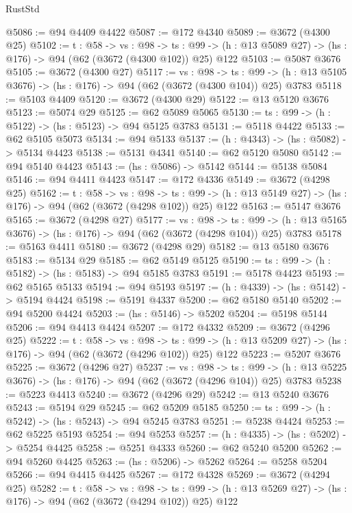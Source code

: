 \begin{lexlean}{RustStd}
\begin{coremodule}
{\begin{coremodule}
{{{{{{{{{@5086 := @94 @4409 @4422
@5087 := @172 @4340
@5089 := @3672 (@4300 @25)
@5102 := {t : @58} ->
  {vs : @98} ->
  {ts : @99} -> (h : @13 @5089 @27) -> (hs : @176) -> @94 (@62 (@3672 (@4300 @102)) @25) @122
@5103 := @5087 @3676
@5105 := @3672 (@4300 @27)
@5117 := {vs : @98} ->
  {ts : @99} -> (h : @13 @5105 @3676) -> (hs : @176) -> @94 (@62 (@3672 (@4300 @104)) @25) @3783
@5118 := @5103 @4409
@5120 := @3672 (@4300 @29)
@5122 := @13 @5120 @3676
@5123 := @5074 @29
@5125 := @62 @5089 @5065
@5130 := {ts : @99} -> (h : @5122) -> (hs : @5123) -> @94 @5125 @3783
@5131 := @5118 @4422
@5133 := @62 @5105 @5073
@5134 := @94 @5133
@5137 := (h : @4343) -> (hs : @5082) -> @5134 @4423
@5138 := @5131 @4341
@5140 := @62 @5120 @5080
@5142 := @94 @5140 @4423
@5143 := (hs : @5086) -> @5142
@5144 := @5138 @5084
@5146 := @94 @4411 @4423
@5147 := @172 @4336
@5149 := @3672 (@4298 @25)
@5162 := {t : @58} ->
  {vs : @98} ->
  {ts : @99} -> (h : @13 @5149 @27) -> (hs : @176) -> @94 (@62 (@3672 (@4298 @102)) @25) @122
@5163 := @5147 @3676
@5165 := @3672 (@4298 @27)
@5177 := {vs : @98} ->
  {ts : @99} -> (h : @13 @5165 @3676) -> (hs : @176) -> @94 (@62 (@3672 (@4298 @104)) @25) @3783
@5178 := @5163 @4411
@5180 := @3672 (@4298 @29)
@5182 := @13 @5180 @3676
@5183 := @5134 @29
@5185 := @62 @5149 @5125
@5190 := {ts : @99} -> (h : @5182) -> (hs : @5183) -> @94 @5185 @3783
@5191 := @5178 @4423
@5193 := @62 @5165 @5133
@5194 := @94 @5193
@5197 := (h : @4339) -> (hs : @5142) -> @5194 @4424
@5198 := @5191 @4337
@5200 := @62 @5180 @5140
@5202 := @94 @5200 @4424
@5203 := (hs : @5146) -> @5202
@5204 := @5198 @5144
@5206 := @94 @4413 @4424
@5207 := @172 @4332
@5209 := @3672 (@4296 @25)
@5222 := {t : @58} ->
  {vs : @98} ->
  {ts : @99} -> (h : @13 @5209 @27) -> (hs : @176) -> @94 (@62 (@3672 (@4296 @102)) @25) @122
@5223 := @5207 @3676
@5225 := @3672 (@4296 @27)
@5237 := {vs : @98} ->
  {ts : @99} -> (h : @13 @5225 @3676) -> (hs : @176) -> @94 (@62 (@3672 (@4296 @104)) @25) @3783
@5238 := @5223 @4413
@5240 := @3672 (@4296 @29)
@5242 := @13 @5240 @3676
@5243 := @5194 @29
@5245 := @62 @5209 @5185
@5250 := {ts : @99} -> (h : @5242) -> (hs : @5243) -> @94 @5245 @3783
@5251 := @5238 @4424
@5253 := @62 @5225 @5193
@5254 := @94 @5253
@5257 := (h : @4335) -> (hs : @5202) -> @5254 @4425
@5258 := @5251 @4333
@5260 := @62 @5240 @5200
@5262 := @94 @5260 @4425
@5263 := (hs : @5206) -> @5262
@5264 := @5258 @5204
@5266 := @94 @4415 @4425
@5267 := @172 @4328
@5269 := @3672 (@4294 @25)
@5282 := {t : @58} ->
  {vs : @98} ->
  {ts : @99} -> (h : @13 @5269 @27) -> (hs : @176) -> @94 (@62 (@3672 (@4294 @102)) @25) @122
}}}}}}}}}
\end{coremodule}}
\end{coremodule}
\end{lexlean}
